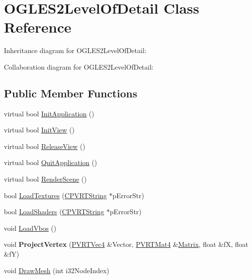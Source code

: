 \hypertarget{class_o_g_l_e_s2_level_of_detail}{\section{O\+G\+L\+E\+S2\+Level\+Of\+Detail Class Reference}
\label{class_o_g_l_e_s2_level_of_detail}
}


Inheritance diagram for O\+G\+L\+E\+S2\+Level\+Of\+Detail\+:


Collaboration diagram for O\+G\+L\+E\+S2\+Level\+Of\+Detail\+:
\subsection*{Public Member Functions}
\begin{DoxyCompactItemize}
\item 
virtual bool \hyperlink{class_o_g_l_e_s2_level_of_detail_a8050448a93fb60c325b62b74e51ce40e}{Init\+Application} ()
\item 
virtual bool \hyperlink{class_o_g_l_e_s2_level_of_detail_adf1b25533c0f1c24b44dc268639be48a}{Init\+View} ()
\item 
virtual bool \hyperlink{class_o_g_l_e_s2_level_of_detail_a96586a44e307b007a64c2af522bc2db5}{Release\+View} ()
\item 
virtual bool \hyperlink{class_o_g_l_e_s2_level_of_detail_a847fba5a7454e2763c87b85c2063c50b}{Quit\+Application} ()
\item 
virtual bool \hyperlink{class_o_g_l_e_s2_level_of_detail_ac7b902ab90d99c5c385d3d0a81e4d598}{Render\+Scene} ()
\item 
bool \hyperlink{class_o_g_l_e_s2_level_of_detail_a3789f43cffbc50a3eedf7a3f2d0c952c}{Load\+Textures} (\hyperlink{class_c_p_v_r_t_string}{C\+P\+V\+R\+T\+String} $\ast$p\+Error\+Str)
\item 
bool \hyperlink{class_o_g_l_e_s2_level_of_detail_a55d5ba35bc156ab75b010be13c521c69}{Load\+Shaders} (\hyperlink{class_c_p_v_r_t_string}{C\+P\+V\+R\+T\+String} $\ast$p\+Error\+Str)
\item 
void \hyperlink{class_o_g_l_e_s2_level_of_detail_ab184991705be6bb12939c2d046bfcf37}{Load\+Vbos} ()
\item 
\hypertarget{class_o_g_l_e_s2_level_of_detail_a75708075138f9b7d9fd2f29e77b4dd9c}{void {\bfseries Project\+Vertex} (\hyperlink{struct_p_v_r_t_vec4}{P\+V\+R\+T\+Vec4} \&Vector, \hyperlink{struct_p_v_r_t_mat4}{P\+V\+R\+T\+Mat4} \&\hyperlink{class_matrix}{Matrix}, float \&f\+X, float \&f\+Y)}\label{class_o_g_l_e_s2_level_of_detail_a75708075138f9b7d9fd2f29e77b4dd9c}

\item 
void \hyperlink{class_o_g_l_e_s2_level_of_detail_adb81a625208cca76315b21073ac9ba80}{Draw\+Mesh} (int i32\+Node\+Index)
\end{DoxyCompactItemize}


